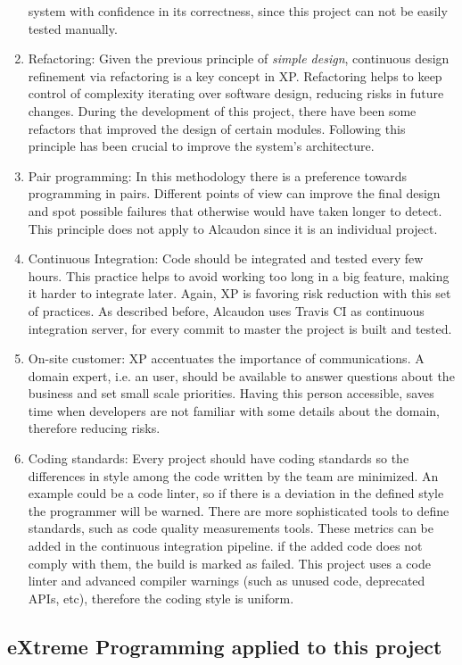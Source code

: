 \begin{enumerate}
  system with confidence in its correctness, since this project can not be
  easily tested manually.
\item Refactoring: Given the previous principle of \textit{simple design},
  continuous design refinement via refactoring is a key concept in \acs{XP}.
  Refactoring helps to keep control of complexity iterating over software
  design, reducing risks in future changes. During the development of this
  project, there have been some refactors that improved the design of certain
  modules. Following this principle has been crucial to improve the system's
  architecture.
\item Pair programming: In this methodology there is a preference towards programming
  in pairs. Different points of view can improve the final design and spot
  possible failures that otherwise would have taken longer to detect. This
  principle does not apply to Alcaudon since it is an individual project.
\item Continuous Integration: Code should be integrated and tested every few
  hours. This practice helps to avoid working too long in a big feature, making
  it harder to integrate later. Again, \acs{XP} is favoring risk reduction with this
  set of practices. As described before, Alcaudon uses Travis CI as continuous
  integration server, for every commit to master the project is built and
  tested.
\item On-site customer: \acs{XP} accentuates the importance of communications. A
  domain expert, i.e. an user, should be available to answer questions about the
  business and set small scale priorities. Having this person accessible, saves
  time when developers are not familiar with some details about the domain, therefore
  reducing risks.
\item Coding standards: Every project should have coding standards so the
  differences in style among the code written by the team are minimized. An
  example could be a code linter, so if there is a deviation in the defined
  style the programmer will be warned. There are more sophisticated tools to
  define standards, such as code quality measurements tools. These metrics can
  be added in the continuous integration pipeline. if the added code does not
  comply with them, the build is marked as failed. This project uses a code
  linter and advanced compiler warnings (such as unused code, deprecated APIs,
  etc), therefore the coding style is uniform.
\end{enumerate}

\subsection{eXtreme Programming applied to this project}

